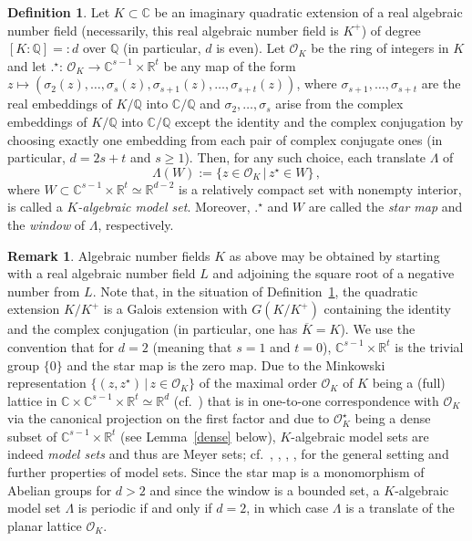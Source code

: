 \documentclass[a4paper]{amsart}
\theoremstyle{definition}
\newtheorem{defi}[theorem]{Definition}
\newtheorem{rem}[theorem]{Remark}
\numberwithin{equation}{section}
\numberwithin{theorem}{section}
\begin{document}
\begin{defi}\label{algmodel}
Let $K\subset{\mathbb{C}}$ be an imaginary quadratic extension
of a real algebraic 
number field (necessarily, this real algebraic number field is $K^+$) of degree
$[K:{\mathbb{Q}}]=:d$ over ${\mathbb{Q}}$  (in particular, $d$ is even). Let
$\mathcal{O}_{K}$ be the ring of integers in $K$ and let $.^{\star}\!:\,
  \mathcal{O}_{K}\rightarrow {\mathbb{C}}^{s-1}\times{\mathbb{R}}^t$ be any map of the form $z\mapsto
  (\sigma_{2}(z),\dots,\sigma_{s}(z),\sigma_{s+1}(z),\dots,\sigma_{s+t}(z))$,
  where
$\sigma_{s+1},\dots,\sigma_{s+t}$ are the real embeddings of
$K/{\mathbb{Q}}$ into ${\mathbb{C}}/{\mathbb{Q}}$ and $\sigma_{2},\dots,\sigma_{s}$ arise from the complex embeddings of
$K/{\mathbb{Q}}$ into ${\mathbb{C}}/{\mathbb{Q}}$ except the identity and the complex conjugation by
choosing exactly one embedding 
from each pair of complex conjugate ones (in particular, $d=2s+t$ and
$s\geq 1$). Then, for any such choice,
each translate $\varLambda$ of
$$
\varLambda(W):=\{z\in\mathcal{O}_{K}\,|\,z^{\star}\in W\}\,,
$$  
where $W\subset
  {\mathbb{C}}^{s-1}\times{\mathbb{R}}^t\simeq{\mathbb{R}}^{d-2}$ is a relatively compact set with nonempty interior, is called a \emph{$K$-algebraic model set}. Moreover, $.^{\star}$ and $W$ are called the \emph{star
    map} and the \emph{window} of $\varLambda$, respectively. 
\end{defi}

\begin{rem}\label{modelrem}
Algebraic number fields $K$ as above may be obtained by starting with
a real algebraic number field $L$ and adjoining the square root of a
negative number from $L$. Note that, in the situation of Definition~\ref{algmodel}, the
quadratic extension $K/K^+$ is a Galois extension with $G(K/K^+)$
containing the identity and the complex conjugation (in particular,
one has $\overline{K}=K$). We use the
convention that for $d=2$ (meaning that $s=1$ and $t=0$), ${\mathbb{C}}^{s-1}\times{\mathbb{R}}^t$ is the trivial group $\{0\}$ and the star map is the zero
  map. Due to the Minkowski
representation 
$
\{(z,z^{\star})\,|\,z\in\mathcal{O}_{K}\}
$ of the maximal order $\mathcal{O}_{K}$ of $K$   
being a (full) lattice in ${\mathbb{C}}\times{\mathbb{C}}^{s-1}\times{\mathbb{R}}^t\simeq {\mathbb{R}}^d$ (cf.~\cite[Ch.~2,
Sec.~3]{Bo}) that is in one-to-one correspondence with
$\mathcal{O}_{K}$ via the canonical 
projection on the first factor and due to 
$\mathcal{O}_{K}^{\star}$ being a dense subset of
${\mathbb{C}}^{s-1}\times{\mathbb{R}}^t$ (see Lemma~\ref{dense} below),
$K$-algebraic model sets are indeed {\em model sets} and thus
are 
Meyer sets; cf.~\cite{BM}, \cite{BM2}, \cite{Moody},  \cite{Schl2},  \cite{Schl} for the
  general setting and further properties of model sets. Since the
  star map is a monomorphism of Abelian groups for $d>2$ and since the
  window is a bounded set, a $K$-algebraic model set
  $\varLambda$ is periodic if and only if $d=2$, in which case $\varLambda$ is a
  translate of the planar lattice $\mathcal{O}_K$. 
\end{rem}
\end{document}
